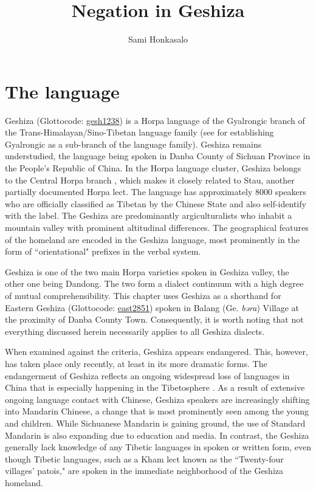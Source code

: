 \documentclass[output=paper,colorlinks,citecolor=brown]{langscibook}
\author{Sami Honkasalo\affiliation{University of Helsinki}}
\title{Negation in Geshiza}
\begin{document}
\maketitle
\section{The language}


Geshiza (Glottocode: \href{https://glottolog.org/resource/languoid/id/gesh1238}{gesh1238}) is a Horpa language of the Gyalrongic branch of the Trans-Himalayan/Sino-Tibetan language family (see \citealt{Sun2000a, Sun2000b}  for establishing Gyalrongic as a sub-branch of the language family). Geshiza remains understudied, the language being spoken in Danba County of Sichuan Province in the People’s Republic of China. In the Horpa language cluster, Geshiza belongs to the Central Horpa branch \citep{Sun2019}, which makes it closely related to Stau, another partially documented Horpa lect. The language has approximately 8000 speakers who are officially classified as Tibetan by the Chinese State and also self-identify with the label. The Geshiza are predominantly argiculturalists who inhabit a mountain valley with prominent altitudinal differences. The geographical features of the homeland are encoded in the Geshiza language, most prominently in the form of ``orientational" prefixes in the verbal system.

Geshiza is one of the two main Horpa varieties spoken in Geshiza valley, the other one being Dandong. The two form a dialect continuum with a high degree of mutual comprehensibility. This chapter uses Geshiza as a shorthand for Eastern Geshiza (Glottocode: \href{https://glottolog.org/resource/languoid/id/east2851}{east2851}) spoken in Balang (Ge. \textit{bəra}) Village at the proximity of Danba County Town. Consequently, it is worth noting that not everything discussed herein necessarily applies to all Geshiza dialects. 


When examined against the \citet{UNESCO2003} criteria, Geshiza appears endangered. This, however, has taken place only recently, at least in its more dramatic forms. The endangerment of Geshiza reflects an ongoing widespread loss of languages in China that is especially happening in the Tibetosphere \citep [24]{Roche2017}. As a result of extensive ongoing language contact with Chinese, Geshiza speakers are increasingly shifting into Mandarin Chinese, a change that is most prominently seen among the young and children. While Sichuanese Mandarin is gaining ground, the use of Standard Mandarin is also expanding due to education and media. In contrast, the Geshiza generally lack knowledge of any Tibetic languages in spoken or written form, even though Tibetic languages, such as a Kham lect known as the ``Twenty-four villages’ patois," are spoken in the immediate neighborhood of the Geshiza homeland.
\end{document}
